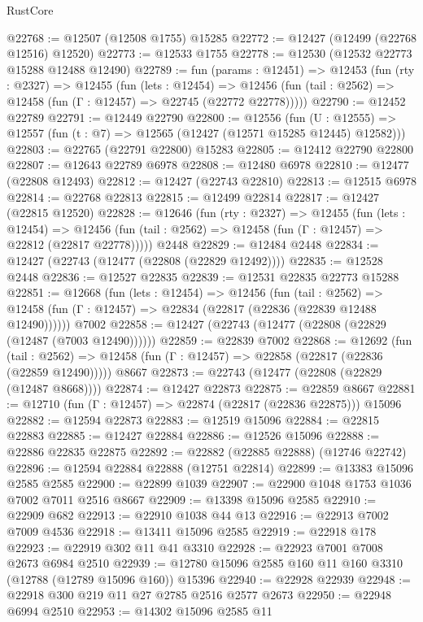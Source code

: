 \begin{lexlean}{RustCore}
\begin{coremodule}
@22768 := @12507 (@12508 @1755) @15285
@22772 := @12427 (@12499 (@22768 @12516) @12520)
@22773 := @12533 @1755
@22778 := @12530 (@12532 @22773 @15288 @12488 @12490)
@22789 := fun (params : @12451) =>
  @12453
    (fun (rty : @2327) =>
    @12455
      (fun (lets : @12454) =>
      @12456 (fun (tail : @2562) => @12458 (fun (Γ : @12457) => @22745 (@22772 @22778)))))
@22790 := @12452 @22789
@22791 := @12449 @22790
@22800 := @12556
    (fun (U : @12555) => @12557 (fun (t : @7) => @12565 (@12427 (@12571 @15285 @12445) @12582)))
@22803 := @22765 (@22791 @22800) @15283
@22805 := @12412 @22790 @22800
@22807 := @12643 @22789 @6978
@22808 := @12480 @6978
@22810 := @12477 (@22808 @12493)
@22812 := @12427 (@22743 @22810)
@22813 := @12515 @6978
@22814 := @22768 @22813
@22815 := @12499 @22814
@22817 := @12427 (@22815 @12520)
@22828 := @12646
    (fun (rty : @2327) =>
    @12455
      (fun (lets : @12454) =>
      @12456 (fun (tail : @2562) => @12458 (fun (Γ : @12457) => @22812 (@22817 @22778)))))
    @2448
@22829 := @12484 @2448
@22834 := @12427 (@22743 (@12477 (@22808 (@22829 @12492))))
@22835 := @12528 @2448
@22836 := @12527 @22835
@22839 := @12531 @22835 @22773 @15288
@22851 := @12668
    (fun (lets : @12454) =>
    @12456
      (fun (tail : @2562) =>
      @12458 (fun (Γ : @12457) => @22834 (@22817 (@22836 (@22839 @12488 @12490))))))
    @7002
@22858 := @12427 (@22743 (@12477 (@22808 (@22829 (@12487 (@7003 @12490))))))
@22859 := @22839 @7002
@22868 := @12692
    (fun (tail : @2562) => @12458 (fun (Γ : @12457) => @22858 (@22817 (@22836 (@22859 @12490)))))
    @8667
@22873 := @22743 (@12477 (@22808 (@22829 (@12487 @8668))))
@22874 := @12427 @22873
@22875 := @22859 @8667
@22881 := @12710 (fun (Γ : @12457) => @22874 (@22817 (@22836 @22875))) @15096
@22882 := @12594 @22873
@22883 := @12519 @15096
@22884 := @22815 @22883
@22885 := @12427 @22884
@22886 := @12526 @15096
@22888 := @22886 @22835 @22875
@22892 := @22882 (@22885 @22888) (@12746 @22742)
@22896 := @12594 @22884 @22888 (@12751 @22814)
@22899 := @13383 @15096 @2585 @2585
@22900 := @22899 @1039
@22907 := @22900 @1048 @1753 @1036 @7002 @7011 @2516 @8667
@22909 := @13398 @15096 @2585
@22910 := @22909 @682
@22913 := @22910 @1038 @44 @13
@22916 := @22913 @7002 @7009 @4536
@22918 := @13411 @15096 @2585
@22919 := @22918 @178
@22923 := @22919 @302 @11 @41 @3310
@22928 := @22923 @7001 @7008 @2673 @6984 @2510
@22939 := @12780 @15096 @2585 @160 @11 @160 @3310 (@12788 (@12789 @15096 @160)) @15396
@22940 := @22928 @22939
@22948 := @22918 @300 @219 @11 @27 @2785 @2516 @2577 @2673
@22950 := @22948 @6994 @2510
@22953 := @14302 @15096 @2585 @11

\end{coremodule}
\end{lexlean}
